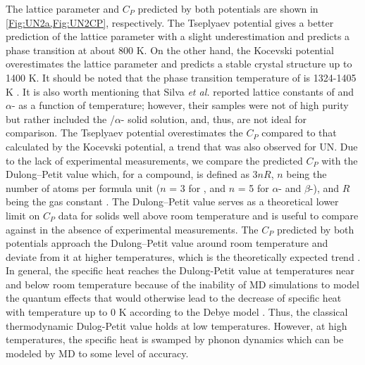 \documentclass[preprint, 12pt]{elsarticle}
\begin{document}
The  lattice parameter and $C_P$ predicted by both potentials are shown in \cref{Fig:UN2a,Fig:UN2CP}, respectively. The Tseplyaev potential gives a better prediction of the  lattice parameter with a slight underestimation and predicts a phase transition at about 800 K. On the other hand, the Kocevski potential overestimates the  lattice parameter and predicts a stable  crystal structure up to 1400 K. It should be noted that the phase transition temperature of  is 1324-1405 K \cite{Uno2020, Okamoto1997}. It is also worth mentioning that Silva \textit{et al.} \cite{Silva2009} reported lattice constants of  and $\alpha$- as a function of temperature; however, their samples were not of high purity but rather included the /$\alpha$- solid solution, and, thus, are not ideal for comparison. The Tseplyaev potential overestimates the  $C_P$ compared to that calculated by the Kocevski potential, a trend that was also observed for UN. Due to the lack of experimental measurements, we compare the predicted $C_P$ with the Dulong–Petit value which, for a compound, is defined as $3 n R$, $n$ being the number of atoms per formula unit ($n$ = 3 for , and $n$ = 5 for $\alpha$- and $\beta$-), and $R$ being the gas constant \cite{White2015}. The Dulong–Petit value serves as a theoretical lower limit on $C_P$ data for solids well above room temperature and is useful to compare against in the absence of experimental measurements. The  $C_P$ predicted by both potentials approach the Dulong–Petit value around room temperature and deviate from it at higher temperatures, which is the theoretically expected trend \cite{Ashcroft1976}. In general, the specific heat reaches the Dulong-Petit value at temperatures near and below room temperature because of the inability of MD simulations to model the quantum effects that would otherwise lead to the decrease of specific heat with temperature up to 0 K according to the Debye model \cite{Ashcroft1976}. Thus, the classical thermodynamic Dulog-Petit value holds at low temperatures. However, at high temperatures, the specific heat is swamped by phonon dynamics which can be modeled by MD to some level of accuracy.
\end{document}

